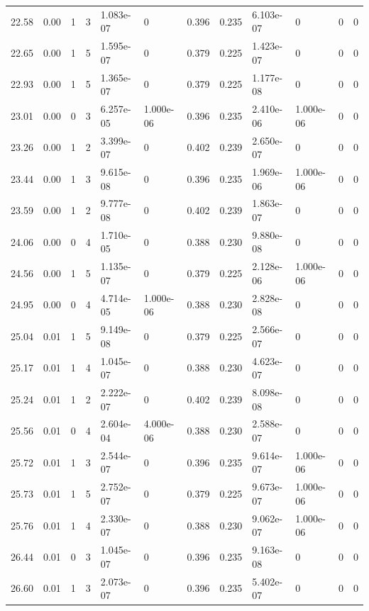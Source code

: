 \documentclass[preview]{standalone}
\begin{document}
{{{\begin{tabular}{L{1.2cm}C{1.2cm} C{0.3cm}C{0.5cm} C{1.4cm}C{1.4cm} C{1.4cm}C{1.4cm} C{1.6cm}C{1.6cm} C{1.6cm}C{1.6cm}}
  22.58  &  0.00  & 1     &  3 &  1.083e-07  & 0  &  0.396&   0.235& 6.103e-07 & 0   &  0 & 0  \\ 
  22.65  &  0.00  & 1     &  5 &  1.595e-07  & 0  &  0.379&   0.225& 1.423e-07 & 0   &  0 & 0  \\ 
  22.93  &  0.00  & 1     &  5 &  1.365e-07  & 0  &  0.379&   0.225& 1.177e-08 & 0   &  0 & 0  \\ 
  23.01  &  0.00  & 0     &  3 &  6.257e-05  & 1.000e-06  &  0.396&   0.235& 2.410e-06 & 1.000e-06   &  0 & 0  \\ 
  23.26  &  0.00  & 1     &  2 &  3.399e-07  & 0  &  0.402&   0.239& 2.650e-07 & 0   &  0 & 0  \\ 
  23.44  &  0.00  & 1     &  3 &  9.615e-08  & 0  &  0.396&   0.235& 1.969e-06 & 1.000e-06   &  0 & 0  \\ 
  23.59  &  0.00  & 1     &  2 &  9.777e-08  & 0  &  0.402&   0.239& 1.863e-07 & 0   &  0 & 0  \\ 
  24.06  &  0.00  & 0     &  4 &  1.710e-05  & 0  &  0.388&   0.230& 9.880e-08 & 0   &  0 & 0  \\ 
  24.56  &  0.00  & 1     &  5 &  1.135e-07  & 0  &  0.379&   0.225& 2.128e-06 & 1.000e-06   &  0 & 0  \\ 
  24.95  &  0.00  & 0     &  4 &  4.714e-05  & 1.000e-06  &  0.388&   0.230& 2.828e-08 & 0   &  0 & 0  \\ 
  25.04  &  0.01  & 1     &  5 &  9.149e-08  & 0  &  0.379&   0.225& 2.566e-07 & 0   &  0 & 0  \\ 
  25.17  &  0.01  & 1     &  4 &  1.045e-07  & 0  &  0.388&   0.230& 4.623e-07 & 0   &  0 & 0  \\ 
  25.24  &  0.01  & 1     &  2 &  2.222e-07  & 0  &  0.402&   0.239& 8.098e-08 & 0   &  0 & 0  \\ 
  25.56  &  0.01  & 0     &  4 &  2.604e-04  & 4.000e-06  &  0.388&   0.230& 2.588e-07 & 0   &  0 & 0  \\ 
  25.72  &  0.01  & 1     &  3 &  2.544e-07  & 0  &  0.396&   0.235& 9.614e-07 & 1.000e-06   &  0 & 0  \\ 
  25.73  &  0.01  & 1     &  5 &  2.752e-07  & 0  &  0.379&   0.225& 9.673e-07 & 1.000e-06   &  0 & 0  \\ 
  25.76  &  0.01  & 1     &  4 &  2.330e-07  & 0  &  0.388&   0.230& 9.062e-07 & 1.000e-06   &  0 & 0  \\ 
  26.44  &  0.01  & 0     &  3 &  1.045e-07  & 0  &  0.396&   0.235& 9.163e-08 & 0   &  0 & 0  \\ 
  26.60  &  0.01  & 1     &  3 &  2.073e-07  & 0  &  0.396&   0.235& 5.402e-07 & 0   &  0 & 0  \\ 

\end{tabular}}}}
\end{document}
